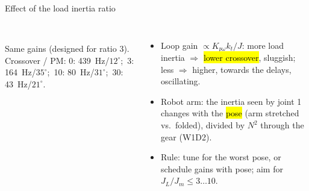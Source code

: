 \documentclass[aspectratio=169,10pt]{beamer}
\begin{document}
\begin{frame}[t]{Effect of the load inertia ratio}
\begin{columns}[T,onlytextwidth]
\\
\scriptsize Same gains (designed for ratio 3). Crossover / PM: 0: \SI{439}{Hz}/$12^\circ$;\ 3: \SI{164}{Hz}/$35^\circ$;\ 10: \SI{80}{Hz}/$31^\circ$;\ 30: \SI{43}{Hz}/$21^\circ$.
\begin{itemize}\small
\item Loop gain $\propto K_{p\omega}k_t/J$: more load inertia $\Rightarrow$ \hl{lower crossover}, sluggish; less $\Rightarrow$ higher, towards the delays, oscillating.
\item Robot arm: the inertia seen by joint 1 changes with the \hl{pose} (arm stretched vs.\ folded), divided by $N^2$ through the gear (W1D2).
\item Rule: tune for the worst pose, or schedule gains with pose; aim for $J_L/J_m\le3\ldots10$.
\end{itemize}
\end{columns}
\end{frame}
\end{document}
